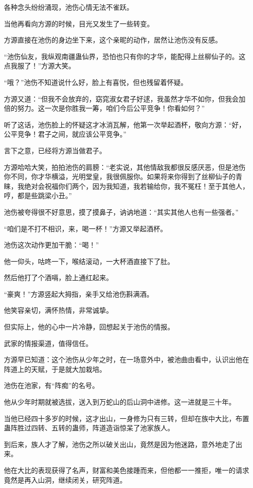 \begin{this_body}
各种念头纷纷涌现，池伤心情无法不雀跃。

当他再看向方源的时候，目光又发生了一些转变。

方源直接在池伤的身边坐下来，这个亲昵的动作，居然让池伤没有反感。

“池伤仙友，我纵观南疆蛊仙界，恐怕也只有你的才华，能配得上丝柳仙子的。这点我服了！”方源大笑。

“哦？”池伤不知道说什么好，脸上有喜悦，但也残留着怀疑。

方源又道：“但我不会放弃的，窈窕淑女君子好逑，我虽然才华不如你，但我会加倍的努力。这一次是你胜我一筹，咱们今后公平竞争！你看如何？”

听了这话，池伤脸上的怀疑这才冰消瓦解，他第一次举起酒杯，敬向方源：“好，公平竞争！君子之间，就应该公平竞争。”

言下之意，已经将方源当做君子。

方源哈哈大笑，拍拍池伤的肩膀：“老实说，其他情敌我都很反感厌恶，但是池伤你不同，你才华横溢，光明堂皇，我很佩服你。如果将来你得到了丝柳仙子的青睐，我绝对会祝福你们两个，因为我知道，我若输给你，我不冤枉！至于其他人，哼，都是些跳梁小丑。”

池伤被夸得很不好意思，摸了摸鼻子，讷讷地道：“其实其他人也有一些强者。”

“咱们是不打不相识，来，喝一杯！”方源又举起酒杯。

池伤这次动作更加干脆：“喝！”

他一仰头，咕咚一下，喉结滚动，一大杯酒直接下了肚。

然后他打了个酒嗝，脸上通红起来。

“豪爽！”方源竖起大拇指，亲手又给池伤斟满酒。

他笑容亲切，满怀热情，非常诚挚。

但实际上，他的心中一片冷静，回想起关于池伤的情报。

武家的情报渠道，值得信任。

方源早已知道：这个池伤从少年之时，在一场意外中，被池曲由看中，认识出他在阵道上的天赋，于是就大加栽培。

池伤在池家，有“阵痴”的名号。

他从少年时期就被选拔，送入到万蛇山的后山洞中进修。这一进就是三十年。

当他已经四十多岁的时候，这才出山，一身修为只有三转，但却在族中大比，布置蛊阵胜过四转、五转的蛊师，阵道造诣惊呆了池家族人。

到后来，族人才了解，池伤之所以破关出山，竟然是因为他迷路，意外地走了出来。

他在大比的表现获得了名声，财富和美色接踵而来，但他都一一推拒，唯一的请求竟然是再入山洞，继续闭关，研究阵道。


\end{this_body}
